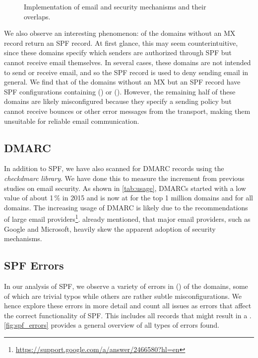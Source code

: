 \begin{figure}[b]
	\centerline{}
	\vspace{-6pt}
	\caption{Implementation of email and security mechanisms and their overlaps.}
	\label{fig:domains_overview}
\end{figure}


We also observe an interesting phenomenon: \NoMXSPFDomainsPerc of the domains without an MX record return an \ac{SPF} record. At first glance, this may seem counterintuitive, since these domains specify which senders are authorized through SPF but cannot receive email themselves. In several cases, these domains are not intended to send or receive email, and so the SPF record is used to deny sending email in general. We find that \NoMXSPFrestrictallDomainsPerc of the domains without an MX but an SPF record have SPF configurations containing  (\numprint{\NoMXSPFdenyallDomains}) or  (\numprint{\NoMXSPFsoftfailallDomains}). However, the remaining half of these domains are likely misconfigured because they specify a sending policy but cannot receive bounces or other error messages from the transport, making them unsuitable for reliable email communication.




\subsection{DMARC}
In addition to SPF, we have also scanned for \ac{DMARC} records using the \emph{checkdmarc library}.
We have done this to measure the increment from previous studies on email security.
As shown in \autoref{tab:usage}, \acp{DMARC} started with a low value of about 1\,\% in 2015 and is now at \DMARCAllDomainsMPerc for the top 1 million domains and \DMARCAllDomainsPerc for all domains. 
The increasing usage of \ac{DMARC} is likely due to the recommendations of large email providers\footnote{\url{https://support.google.com/a/answer/2466580?hl=en}}.
\citeauthor{Durumeric_2015} already mentioned, that major email providers, such as Google and Microsoft, heavily skew the apparent adoption of security mechanisms.


\subsection{SPF Errors}

In our analysis of SPF, we observe a variety of errors in \ErrorDomainsPerc (\numprint{\ErrorDomains}) of the domains, some of which are trivial typos while others are rather subtle misconfigurations.
We hence explore these errors in more detail and count all issues as errors that affect the correct functionality of SPF.
This includes all records that might result in a .
\autoref{fig:spf_errors} provides a general overview of all types of errors found.

